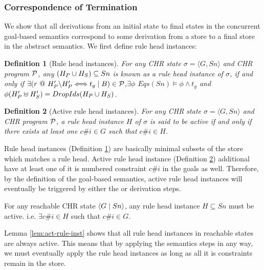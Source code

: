 \documentclass{tlp}
\newtheorem{definition}{Definition}[section]
\begin{document}
\subsubsection{Correspondence of Termination}

We show that all derivations from an initial state to final states in the concurrent 
goal-based semantics correspond to some derivation from a store to a final store
in the abstract semantics. We first define rule head instances:

\begin{definition} [Rule head instances] \label{def:rule-inst}
   For any CHR state $\sigma = \langle G,Sn \rangle$ and CHR program $\cal P$, 
   any $(H_P \cup H_S) \subseteq Sn$ is known as a rule head instance of $\sigma$, if and only if
   $\exists (r~@~H_P' \backslash H_P' \Longleftrightarrow t_g \mid B) \in {\cal P}$,$\exists \phi$ 
   $Eqs(Sn) \models \phi \wedge t_g$ and $\phi(H_P' \uplus H_S') = DropIds(H_P \cup H_S)$.
\end{definition}

\begin{definition} [Active rule head instances] \label{def:act-rule-inst}
   For any CHR state $\sigma = \langle G,Sn \rangle$ and CHR program $\cal P$, a 
   rule head instance $H$ of $\sigma$ is said to be {\em active} if and only if 
   there exists at least one $c\#i \in G$ such that $c\#i \in H$.  
\end{definition}

Rule head instances (Definition \ref{def:rule-inst}) are basically minimal subsets of the store
which matches a rule head. Active rule head instance (Definition \ref{def:act-rule-inst}) additional
have at least one of it is numbered constraint $c\#i$ in the goals as well. Therefore, by the
definition of the goal-based semantics, active rule head instances will eventually be triggered
by either the  or  derivation steps.

\begin{lemma}  \label{lem:act-rule-inst}
  For any reachable CHR state $\langle G\mid Sn \rangle$, any rule head instance $H \subseteq Sn$ must 
  be active. i.e. $\exists c\#i \in H$ such that $c\#i \in G$.
\end{lemma}

Lemma \ref{lem:act-rule-inst} shows that all rule head instances in reachable states are always
active. This means that by applying the semantics steps in any way, we must eventually apply
the rule head instances as long as all it is constraints remain in the store. 
\end{document}
